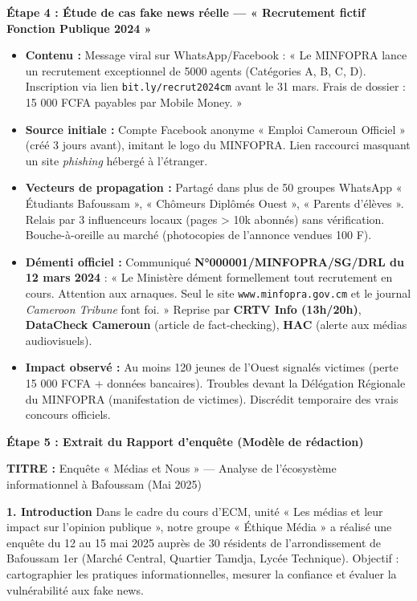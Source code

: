 \documentclass[11pt]{article}
\newcommand{\cle}[1]{{\popxbold\color{popdark}#1}}
\begin{document}
\begin{exoresolu}
\textbf{Étape 4 : Étude de cas \cle{fake news} réelle — « Recrutement fictif Fonction Publique 2024 »}

\begin{itemize}
    \item \textbf{Contenu :} Message viral sur WhatsApp/Facebook : « Le MINFOPRA lance un recrutement exceptionnel de 5000 agents (Catégories A, B, C, D). Inscription via lien \texttt{bit.ly/recrut2024cm} avant le 31 mars. Frais de dossier : 15 000 FCFA payables par Mobile Money. »
    \item \textbf{Source initiale :} Compte Facebook anonyme « Emploi Cameroun Officiel » (créé 3 jours avant), imitant le logo du MINFOPRA. Lien raccourci masquant un site \emph{phishing} hébergé à l'étranger.
    \item \textbf{Vecteurs de propagation :} Partagé dans plus de 50 groupes WhatsApp « Étudiants Bafoussam », « Chômeurs Diplômés Ouest », « Parents d'élèves ». Relais par 3 influenceurs locaux (pages > 10k abonnés) sans vérification. Bouche-à-oreille au marché (photocopies de l'annonce vendues 100 F).
    \item \textbf{Démenti officiel :} Communiqué \textbf{N°000001/MINFOPRA/SG/DRL du 12 mars 2024} : « Le Ministère dément formellement tout recrutement en cours. Attention aux arnaques. Seul le site \texttt{www.minfopra.gov.cm} et le journal \emph{Cameroon Tribune} font foi. » Reprise par \textbf{CRTV Info (13h/20h)}, \textbf{DataCheck Cameroun} (article de fact-checking), \textbf{HAC} (alerte aux médias audiovisuels).
    \item \textbf{Impact observé :} Au moins 120 jeunes de l'Ouest signalés victimes (perte 15 000 FCFA + données bancaires). Troubles devant la Délégation Régionale du MINFOPRA (manifestation de victimes). Discrédit temporaire des vrais concours officiels.
\end{itemize}

\textbf{Étape 5 : Extrait du Rapport d'enquête (Modèle de rédaction)}

\textbf{TITRE :} Enquête « Médias et Nous » — Analyse de l'écosystème informationnel à Bafoussam (Mai 2025)

\textbf{1. Introduction}
Dans le cadre du cours d'ECM, unité « Les médias et leur impact sur l'opinion publique », notre groupe « Éthique Média » a réalisé une enquête du 12 au 15 mai 2025 auprès de 30 résidents de l'arrondissement de Bafoussam 1er (Marché Central, Quartier Tamdja, Lycée Technique). Objectif : cartographier les pratiques informationnelles, mesurer la confiance et évaluer la vulnérabilité aux \cle{fake news}.


\end{exoresolu}
\end{document}

